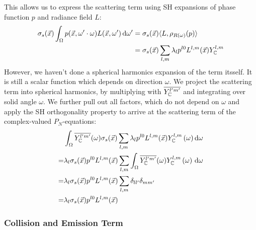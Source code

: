 This allows us to express the scattering term using SH expansions of phase function $p$ and radiance field $L$:
\begin{align*}
\sigma_s(\vec{x})\int_{\Omega}p(\vec{x}, \omega'\cdot\omega)L(\vec{x}, \omega')\,\mathrm{d}\omega'
&=
\sigma_s(\vec{x})\langle L,  \rho_{R(\omega)}(p)\rangle
\\
&=
\sigma_s(\vec{x})
\sum_{l,m}
{
\lambda_l
p^{l0}L^{l,m}(\vec{x})
Y_{\mathbb{C}}^{l,m}
}
\end{align*}
However, we haven't done a spherical harmonics expansion of the term itsself. It is still a scalar function which depends on direction $\omega$. We project the scattering term into spherical harmonics, by multiplying with $\overline {Y_{\mathbb{C}}^{l'm'}}$ and integrating over solid angle $\omega$. We further pull out all factors, which do not depend on $\omega$ and apply the SH orthogonality property to arrive at the scattering term of the complex-valued $P_N$-equations:
\begin{align}
&
\int_{\Omega}
{
\overline{Y_{\mathbb{C}}^{l'm'}}(\omega)
\sigma_s(\vec{x})
\sum_{l,m}
{
\lambda_l
p^{l0}L^{l,m}(\vec{x})
Y_{\mathbb{C}}^{l,m}\left(\omega\right)
}
\,\mathrm{d}\omega
}
\nonumber\\
=&
\lambda_l
\sigma_s(\vec{x})
p^{l0}L^{l,m}(\vec{x})
\sum_{l,m}
{
\int_{\Omega}
{
\overline{Y_{\mathbb{C}}^{l'm'}}(\omega)
Y_{\mathbb{C}}^{l,m}\left(\omega\right)
\,\mathrm{d}\omega
}
}
\nonumber\\
=&
\lambda_l
\sigma_s(\vec{x})
p^{l0}L^{l,m}(\vec{x})
\sum_{l,m}
{
\delta_{ll'}\delta_{mm'}
}
\nonumber\\
=&
\lambda_l
\sigma_s(\vec{x})
p^{l0}L^{l,m}(\vec{x})
\label{eq:sh_complex_scattering}
\end{align}



\subsubsection*{Collision and Emission Term}

